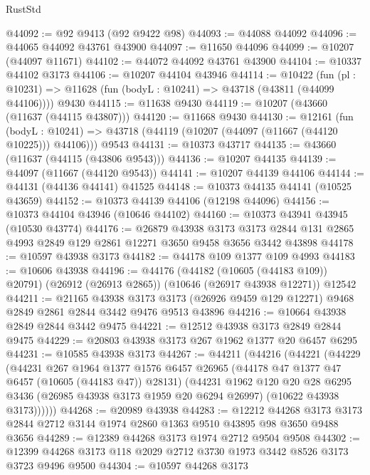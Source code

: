 \begin{lexlean}{RustStd}
\begin{coremodule}
@44092 := @92 @9413 (@92 @9422 @98)
@44093 := @44088 @44092
@44096 := @44065 @44092 @43761 @43900
@44097 := @11650 @44096
@44099 := @10207 (@44097 @11671)
@44102 := @44072 @44092 @43761 @43900
@44104 := @10337 @44102 @3173
@44106 := @10207 @44104 @43946
@44114 := @10422
    (fun (pl : @10231) => @11628 (fun (bodyL : @10241) => @43718 (@43811 (@44099 @44106))))
    @9430
@44115 := @11638 @9430
@44119 := @10207 (@43660 (@11637 (@44115 @43807)))
@44120 := @11668 @9430
@44130 := @12161
    (fun (bodyL : @10241) => @43718 (@44119 (@10207 (@44097 (@11667 (@44120 @10225))) @44106)))
    @9543
@44131 := @10373 @43717
@44135 := @43660 (@11637 (@44115 (@43806 @9543)))
@44136 := @10207 @44135
@44139 := @44097 (@11667 (@44120 @9543))
@44141 := @10207 @44139 @44106
@44144 := @44131 (@44136 @44141) @41525
@44148 := @10373 @44135 @44141 (@10525 @43659)
@44152 := @10373 @44139 @44106 (@12198 @44096)
@44156 := @10373 @44104 @43946 (@10646 @44102)
@44160 := @10373 @43941 @43945 (@10530 @43774)
@44176 := @26879
    @43938
    @3173
    @3173
    @2844
    @131
    @2865
    @4993
    @2849
    @129
    @2861
    @12271
    @3650
    @9458
    @3656
    @3442
    @43898
@44178 := @10597 @43938 @3173
@44182 := @44178 @109 @1377 @109 @4993
@44183 := @10606 @43938
@44196 := @44176
    (@44182 (@10605 (@44183 @109)) @20791)
    (@26912 (@26913 @2865))
    (@10646 (@26917 @43938 @12271))
    @12542
@44211 := @21165
    @43938
    @3173
    @3173
    (@26926 @9459 @129 @12271)
    @9468
    @2849
    @2861
    @2844
    @3442
    @9476
    @9513
    @43896
@44216 := @10664 @43938 @2849 @2844 @3442 @9475
@44221 := @12512 @43938 @3173 @2849 @2844 @9475
@44229 := @20803 @43938 @3173 @267 @1962 @1377 @20 @6457 @6295
@44231 := @10585 @43938 @3173
@44267 := @44211
    (@44216
      (@44221
        (@44229
          (@44231
            @267
            @1964
            @1377
            @1576
            @6457
            @26965
            (@44178 @47 @1377 @47 @6457 (@10605 (@44183 @47)) @28131)
            (@44231
              @1962
              @120
              @20
              @28
              @6295
              @3436
              (@26985 @43938 @3173 @1959 @20 @6294 @26997)
              (@10622 @43938 @3173))))))
@44268 := @20989 @43938
@44283 := @12212
    @44268
    @3173
    @3173
    @2844
    @2712
    @3144
    @1974
    @2860
    @1363
    @9510
    @43895
    @98
    @3650
    @9488
    @3656
@44289 := @12389 @44268 @3173 @1974 @2712 @9504 @9508
@44302 := @12399 @44268 @3173 @118 @2029 @2712 @3730 @1973 @3442 @8526 @3173 @3723 @9496 @9500
@44304 := @10597 @44268 @3173

\end{coremodule}
\end{lexlean}
